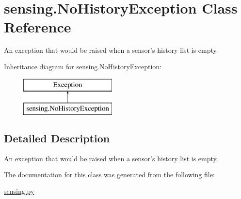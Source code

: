 \hypertarget{classsensing_1_1_no_history_exception}{\section{sensing.\-No\-History\-Exception Class Reference}
\label{classsensing_1_1_no_history_exception}
}


An exception that would be raised when a sensor's history list is empty.  


Inheritance diagram for sensing.\-No\-History\-Exception\-:\begin{figure}[H]
\begin{center}
\leavevmode
\includegraphics[height=2.000000cm]{classsensing_1_1_no_history_exception}
\end{center}
\end{figure}


\subsection{Detailed Description}
An exception that would be raised when a sensor's history list is empty. 

The documentation for this class was generated from the following file\-:\begin{DoxyCompactItemize}
\item 
\hyperlink{sensing_8py}{sensing.\-py}\end{DoxyCompactItemize}
